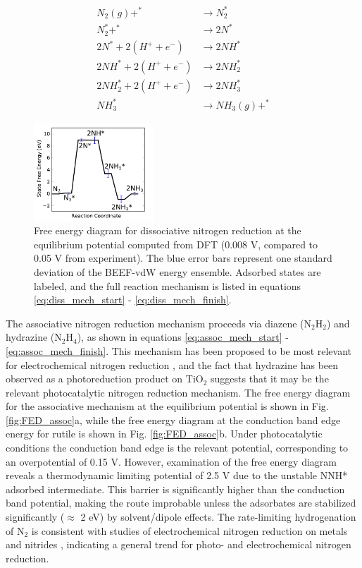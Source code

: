 \documentclass[journal=ascecg,manuscript=article,articletitle=true]{achemso}
\begin{document}
\begin{align}
	\label{eq:diss_mech_start}
	N_2(g)+^*  & \rightarrow N_2^{*} \\
    N_2^* + ^*  & \rightarrow 2N^*\\
    2N^* + 2(H^+ + e^-) & \rightarrow 2NH^* \\
    2NH^* + 2(H^+ + e^-) & \rightarrow 2NH_2^* \\
    2NH_2^* + 2(H^+ + e^-) & \rightarrow 2NH_3^* \\
    NH_3^*  & \rightarrow NH_3(g) + ^{*}
    \label{eq:diss_mech_finish}
\end{align}

\begin{figure}
\includegraphics[width=0.4\textwidth]{figures/dissociative_path_edited.pdf}
\caption{Free energy diagram for dissociative nitrogen reduction at the equilibrium potential computed from DFT (0.008 V, compared to 0.05 V from experiment). The blue error bars represent one standard deviation of the BEEF-vdW energy ensemble. Adsorbed states are labeled, and the full reaction mechanism is listed in equations \ref{eq:diss_mech_start} - \ref{eq:diss_mech_finish}.}
\label{fig:reaction_mechanism_diss}
\end{figure}

The associative nitrogen reduction mechanism proceeds via diazene (N$_2$H$_2$) and hydrazine (N$_2$H$_4$), as shown in equations \ref{eq:assoc_mech_start} - \ref{eq:assoc_mech_finish}. This mechanism has been proposed to be most relevant for electrochemical nitrogen reduction \cite{Skulason_2012,van_der_Ham_2014}, and the fact that hydrazine has been observed as a photoreduction product on TiO$_2$ \cite{Schrauzer_2011} suggests that it may be the relevant photocatalytic nitrogen reduction mechanism. The free energy diagram for the associative mechanism at the equilibrium potential is shown in Fig. \ref{fig:FED_assoc}a, while the free energy diagram at the conduction band edge energy for rutile is shown in Fig. \ref{fig:FED_assoc}b. Under photocatalytic conditions the conduction band edge is the relevant potential, corresponding to an overpotential of 0.15 V. However, examination of the free energy diagram reveals a thermodynamic limiting potential of 2.5 V due to the unstable NNH* adsorbed intermediate. This barrier is significantly higher than the conduction band potential, making the route improbable unless the adsorbates are stabilized significantly ($\approx$ 2 eV) by solvent/dipole effects. The rate-limiting hydrogenation of N$_2$ is consistent with studies of electrochemical nitrogen reduction on metals \cite{Skulason_2012} and nitrides \cite{Abghoui_2016}, indicating a general trend for photo- and electrochemical nitrogen reduction.
\end{document}
